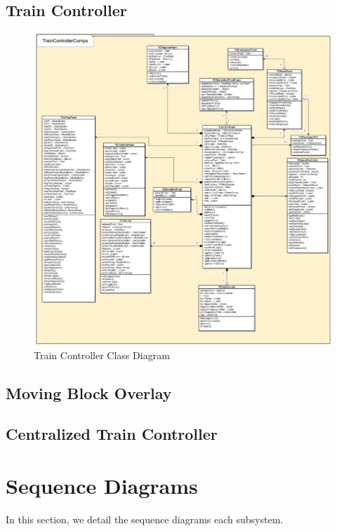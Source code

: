 \documentclass[]{article}
\begin{document}
\subsection{Train Controller}
\begin{figure}[H]
	\centering
	\includegraphics[width=\textwidth]{tc_classdiagram.png}
	\caption{Train Controller Class Diagram}
\end{figure}
\subsection{Moving Block Overlay}
\subsection{Centralized Train Controller}


\section{Sequence Diagrams}
In this section, we detail the sequence diagrams each subsystem.
\end{document}
